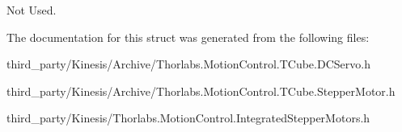 Not Used. 



The documentation for this struct was generated from the following files\+:\begin{DoxyCompactItemize}
\item 
third\+\_\+party/\+Kinesis/\+Archive/Thorlabs.\+Motion\+Control.\+T\+Cube.\+D\+C\+Servo.\+h\item 
third\+\_\+party/\+Kinesis/\+Archive/Thorlabs.\+Motion\+Control.\+T\+Cube.\+Stepper\+Motor.\+h\item 
third\+\_\+party/\+Kinesis/Thorlabs.\+Motion\+Control.\+Integrated\+Stepper\+Motors.\+h\end{DoxyCompactItemize}
